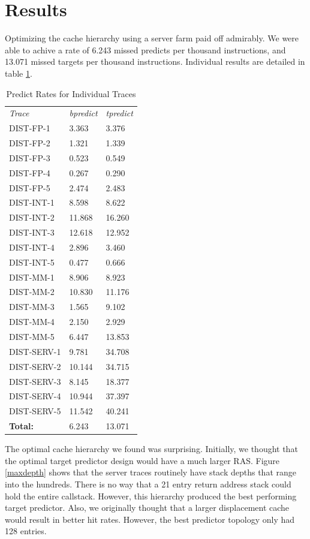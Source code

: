 \documentclass[twocolumn]{article}
\begin{document}
\section{Results}

Optimizing the cache hierarchy using a server farm paid off
admirably. We were able to achive a rate of 6.243 missed predicts per
thousand instructions, and 13.071 missed targets per thousand
instructions. Individual results are detailed in table \ref{bdibd}.


\begin{table}\begin{center}\begin{tabular}{lll}
\textit{Trace} & \textit{bpredict} & \textit{tpredict} \\
DIST-FP-1  & 3.363 & 3.376 \\
DIST-FP-2  & 1.321 & 1.339 \\
DIST-FP-3  & 0.523 & 0.549 \\
DIST-FP-4  & 0.267 & 0.290 \\
DIST-FP-5  & 2.474 & 2.483 \\
DIST-INT-1 & 8.598 & 8.622 \\
DIST-INT-2 &11.868 &16.260 \\
DIST-INT-3 &12.618 &12.952 \\
DIST-INT-4 & 2.896 & 3.460 \\
DIST-INT-5 & 0.477 & 0.666 \\
DIST-MM-1  & 8.906 & 8.923 \\
DIST-MM-2  &10.830 &11.176 \\
DIST-MM-3  & 1.565 & 9.102 \\
DIST-MM-4  & 2.150 & 2.929 \\
DIST-MM-5  & 6.447 &13.853 \\
DIST-SERV-1& 9.781 &34.708 \\
DIST-SERV-2&10.144 &34.715 \\
DIST-SERV-3& 8.145 &18.377 \\
DIST-SERV-4&10.944 &37.397 \\
DIST-SERV-5&11.542 &40.241 \\
\hline
\textbf{Total:} & 6.243&13.071
\end{tabular}\end{center}
\caption{Predict Rates for Individual Traces}
\label{bdibd}
\end{table}

The optimal cache hierarchy we found was surprising. Initially, we
thought that the optimal target predictor design would have a much
larger RAS. Figure \ref{maxdepth} shows that the server traces
routinely have stack depths that range into the hundreds. There is no
way that a 21 entry return address stack could hold the entire
callstack. However, this hierarchy produced the best performing target
predictor. Also, we originally thought that a larger displacement
cache would result in better hit rates. However, the best predictor
topology only had 128 entries.
\end{document}
